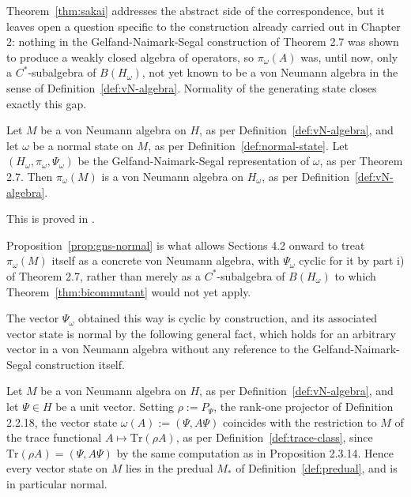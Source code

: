Theorem~\ref{thm:sakai} addresses the abstract side of the
correspondence, but it leaves open a question specific to the
construction already carried out in Chapter 2: nothing in the
Gelfand-Naimark-Segal construction of Theorem 2.7 was shown to produce
a weakly closed algebra of operators, so $\pi_\omega(A)$ was, until now,
only a $C^*$-subalgebra of $B(H_\omega)$, not yet known to be a von
Neumann algebra in the sense of Definition~\ref{def:vN-algebra}.
Normality of the generating state closes exactly this gap.

\begin{proposition}\label{prop:gns-normal}
	Let $M$ be a von Neumann algebra on $H$, as per
	Definition~\ref{def:vN-algebra}, and let $\omega$ be a normal state on
	$M$, as per Definition~\ref{def:normal-state}. Let $(H_\omega,
	\pi_\omega, \Psi_\omega)$ be the Gelfand-Naimark-Segal representation
	of $\omega$, as per Theorem 2.7. Then $\pi_\omega(M)$ is a von Neumann
	algebra on $H_\omega$, as per Definition~\ref{def:vN-algebra}.
\end{proposition}
\noindent This is proved in \cite[TODO: collocazione precisa]{TODO-GNSnormal}.

\begin{remark}
	Proposition~\ref{prop:gns-normal} is what allows Sections 4.2 onward to
	treat $\pi_\omega(M)$ itself as a concrete von Neumann algebra, with
	$\Psi_\omega$ cyclic for it by part i) of Theorem 2.7, rather than
	merely as a $C^*$-subalgebra of $B(H_\omega)$ to which
	Theorem~\ref{thm:bicommutant} would not yet apply.
\end{remark}

The vector $\Psi_\omega$ obtained this way is cyclic by construction,
and its associated vector state is normal by the following general
fact, which holds for an arbitrary vector in a von Neumann algebra
without any reference to the Gelfand-Naimark-Segal construction itself.

\begin{remark}\label{rem:vector-normal}
	Let $M$ be a von Neumann algebra on $H$, as per
	Definition~\ref{def:vN-algebra}, and let $\Psi \in H$ be a unit vector.
	Setting $\rho := P_\Psi$, the rank-one projector of Definition 2.2.18,
	the vector state $\omega(A) := (\Psi, A\Psi)$ coincides with the
	restriction to $M$ of the trace functional $A \mapsto \mathrm{Tr}(\rho
	A)$, as per Definition~\ref{def:trace-class}, since $\mathrm{Tr}(\rho
	A) = (\Psi, A\Psi)$ by the same computation as in Proposition 2.3.14.
	Hence every vector state on $M$ lies in the predual $M_*$ of
	Definition~\ref{def:predual}, and is in particular normal.
\end{remark}

